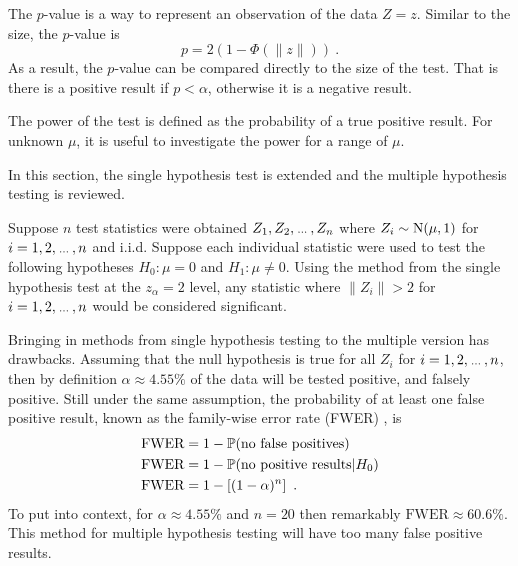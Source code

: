 The $p$-value is a way to represent an observation of the data $Z=z$. Similar to the size, the $p$-value is
\begin{equation}
    p=2(1-\Phi(\|z\|)) \ .
\end{equation}
As a result, the $p$-value can be compared directly to the size of the test. That is there is a positive result if $p<\alpha$, otherwise it is a negative result.

The power of the test is defined as the probability of a true positive result. For unknown $\mu$, it is useful to investigate the power for a range of $\mu$.

In this section, the single hypothesis test is extended and the multiple hypothesis testing \citep{shaffer1995multiple, dudoit2003multiple} is reviewed.

Suppose $n$ test statistics were obtained $Z_1,Z_2,\dotdotdot,Z_n$ where $Z_i\sim\operatorname{N}(\mu,1)$ for $i=1,2,\dotdotdot,n$ and i.i.d. Suppose each individual statistic were used to test the following hypotheses $H_0:\mu=0$ and $H_1:\mu\neq 0$. Using the method from the single hypothesis test at the $z_\alpha=2$ level, any statistic where $\|Z_i\|>2$ for $i=1,2,\dotdotdot,n$ would be considered significant.

Bringing in methods from single hypothesis testing to the multiple version has drawbacks. Assuming that the null hypothesis is true for all $Z_i$ for $i=1,2,\dotdotdot,n$, then by definition $\alpha\approx 4.55\%$ of the data will be tested positive, and falsely positive. Still under the same assumption, the probability of at least one false positive result, known as the family-wise error rate (FWER) \citep{shaffer1995multiple}, is
\begin{align}
    \text{FWER}&=1-\operatorname{\mathbb{P}}(\text{no false positives}) \nonumber\\
    \text{FWER}&=1-\operatorname{\mathbb{P}}(\text{no positive results}|H_0) \nonumber\\
    \text{FWER}&=1-\left[(1-\alpha)^n\right] \label{eq:inference_fwer}\ .
\end{align}
To put into context, for $\alpha\approx 4.55\%$ and $n=20$ then remarkably $\text{FWER}\approx60.6\%$. This method for multiple hypothesis testing will have too many false positive results.

